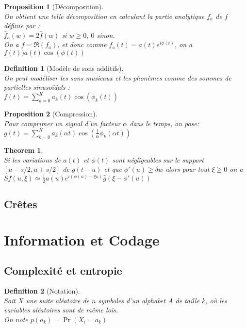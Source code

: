 \documentclass[a4paper]{article}
\newtheorem*{prop}{Proposition}
\newtheorem*{definition}{Definition}
\newtheorem*{theorem}{Theorem}
\renewcommand{\geq}{\geqslant}
\renewcommand{\(}{\left(}
\renewcommand{\)}{\right)}
\begin{document}
\begin{prop}[Décomposition]~\\
  On obtient une telle décomposition en calculant la partie analytique $f_a$ de
  $f$ définie par :\\
  $\hat{f}_a(w) = 2\hat{f}(w)$ si $w \geq 0$, $0$ sinon.\\
  On a $f = \Re(f_a)$, et donc comme $f_a(t) = a(t)e^{i\phi(t)}$, on a $f(t) ) a(t)\cos\(\phi(t)\)$
\end{prop}

\begin{definition}[Modèle de sons additifs]~\\
  On peut modéliser les sons musicaux et les phonèmes comme des sommes de
  partielles sinusoïdals :\\
  $f(t) = \sum\limits_{k=0}^K a_k(t) \cos\(\phi_k( t)\)$
\end{definition}

\begin{prop}[Compression]~\\
  Pour comprimer un signal d'un facteur $\alpha$ dans le temps, on pose:\\
  $g(t) = \sum\limits_{k=0}^K a_k(\alpha t) \cos\(\frac{1}{\alpha}\phi_k(\alpha t)\)$
\end{prop}

\begin{theorem}~\\
  Si les variations de $a(t)$ et $\phi(t)$ sont négligeables sur le support
  $[u-s/2,u+s/2]$ de $g(t-u)$ et que $\phi'(u) \geq \delta w$ alors pour tout
  $\xi \geq 0$ on a\\
  $Sf(u,\xi) \simeq \frac{1}{2}a(u)e^{i(\phi(u)-\xi u)}\hat{g}(\xi - \phi'(u))$
\end{theorem}

\subsection{Crêtes}

\section{Information et Codage}

\subsection{Complexité et entropie}

\begin{definition}[Notation]~\\
  Soit $X$ une suite aléatoire de $n$ symboles d'un alphabet $A$ de taille $k$,
  où les variables aléatoires sont de même lois.\\
  On note $p(a_k) = \Pr(X_i = a_k)$
\end{definition}
\end{document}
